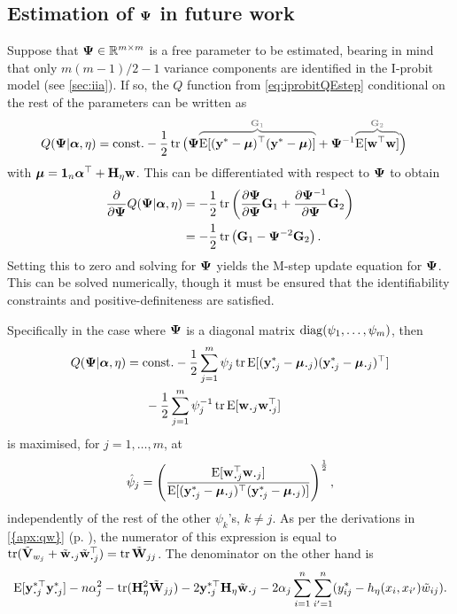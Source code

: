 \subsection{Estimation of \texorpdfstring{${\bm\Psi}$}{$\Psi$} in future work}
\label{sec:difficultPsi}

Suppose that ${\bm\Psi} \in \mathbb{R}^{m\times m}$ is a free parameter to be estimated, bearing in mind that only $m(m-1)/2 - 1$ variance components are identified in the I-probit model (see \cref{sec:iia}).
If so, the $Q$ function from \cref{eq:iprobitQEstep} conditional on the rest of the parameters can be written as
\vspace{-1em}
\begin{align*}
  Q(\bPsi|\balpha,\eta)
  &= \const 
  -\half \tr 
  \big( 
  \bPsi
  \greyoverbrace{\E[(\by^* - \bmu)^\top (\by^* - \bmu)]}{\bG_1}
  +
  \bPsi^{-1}
  \greyoverbrace{\E[\bw^\top\bw]}{\bG_2} 
  \Big)
\end{align*}
with ${\bm\mu} = {\mathbf 1}_n{\bm\alpha}^\top + {\mathbf H}_\eta{\mathbf w}$.
This can be differentiated with respect to ${\bm\Psi}$ to obtain
\begin{align*}
  \frac{\partial}{\partial{\bm\Psi}}Q({\bm\Psi}|{\bm\alpha},\eta)
  &= -\frac{1}{2} \operatorname{tr} \left(\frac{\partial{\bm\Psi}}{\partial{\bm\Psi}}{\mathbf G}_1 + \frac{\partial{\bm\Psi}^{-1}}{\partial{\bm\Psi}}{\mathbf G}_2 \right) \\
  &= -\frac{1}{2} \operatorname{tr} \left({\mathbf G}_1 - {\bm\Psi}^{-2} {\mathbf G}_2 \right). 
\end{align*}
Setting this to zero and solving for ${\bm\Psi}$ yields the M-step update equation for ${\bm\Psi}$. 
This can be solved numerically, though it must be ensured that the identifiability constraints and positive-definiteness are satisfied.

Specifically in the case where ${\bm\Psi}$ is a diagonal matrix $\operatorname{diag}(\psi_1,\dots,\psi_m)$, then
\begin{align*}
  \vspace{-0.5em}
  Q(\bPsi|\balpha,\eta)
  &= \const -\half \sum_{j=1}^m \psi_j \tr
  \E[(\by^*_{\bigcdot j} - \bmu_{\bigcdot j})(\by^*_{\bigcdot j} - \bmu_{\bigcdot j})^\top] \\
  &\phantom{==} -\half \sum_{j=1}^m \psi_j^{-1} \tr
  \E[\bw_{\bigcdot j}\bw_{\bigcdot j}^\top] 
  \vspace{-0.5em}
\end{align*}
is maximised, for $j=1,\dots,m$, at
\[
  \hat\psi_j = \left( 
  \frac{\E[ \bw_{\bigcdot j}^\top\bw_{\bigcdot j} ] }{\E[ (\by^*_{\bigcdot j} - \bmu_{\bigcdot j})^\top (\by^*_{\bigcdot j} - \bmu_{\bigcdot j}) ]}
  \right)^{\half},
\] 
independently of the rest of the other $\psi_k$'s, $k\neq j$.
As per the derivations in \cref{{apx:qw}} (p. \pageref{eq:trCEwDw}), the numerator of this expression is equal to $\tr(\tilde\bV_{w_j} + \tilde\bw_{\bigcdot j}\tilde\bw_{\bigcdot j}^\top) = \tr \tilde\bW_{jj}$.
The denominator on the other hand is
\[
  \E[\by_{\bigcdot j}^{*\top}\by_{\bigcdot j}^*] - 
  n\alpha_j^2 - \tr( \bH_\eta^2 \tilde\bW_{jj}) 
  - 2\by^{*\top}_{\bigcdot j}\bH_\eta\tilde\bw_{\bigcdot j}
  - 2\alpha_j \sum_{i=1}^n\sum_{i'=1}^n (y_{ij}^* - h_\eta(x_{i},x_{i'}) \tilde w_{ij}).
\]


